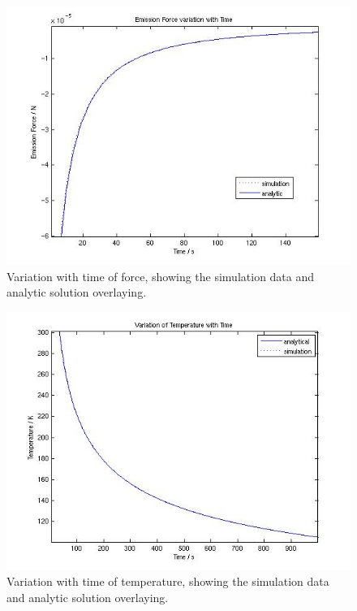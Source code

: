 \begin{description}
    \begin{figure}
         \includegraphics[width=180mm]{figs/Fe_int/force_analytic.jpg}
         \caption{Variation with time of force, showing the simulation data
         and analytic solution overlaying.}
         \label{fig:forceanalytic}
    \end{figure}
    \begin{figure}
         \includegraphics[width=180mm]{figs/Fe_int/temperature_analytic.jpg}
         \caption{Variation with time of temperature, showing the simulation data
         and analytic solution overlaying.}
         \label{fig:temperatureanalytic}
    \end{figure}

  \end{description}
  \clearpage

